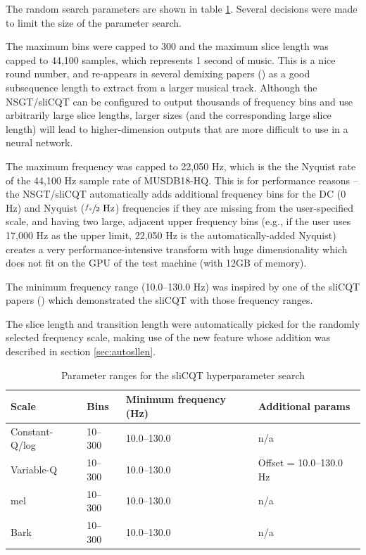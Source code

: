 \documentclass[report.tex]{subfiles}
\begin{document}
The random search parameters are shown in table \ref{table:slicqparams}. Several decisions were made to limit the size of the parameter search.

The maximum bins were capped to 300 and the maximum slice length was capped to 44,100 samples, which represents 1 second of music. This is a nice round number, and re-appears in several demixing papers (\cite{plumbley1, plumbley2, demucs}) as a good subsequence length to extract from a larger musical track. Although the NSGT/sliCQT can be configured to output thousands of frequency bins and use arbitrarily large slice lengths, larger sizes (and the corresponding large slice length) will lead to higher-dimension outputs that are more difficult to use in a neural network.

The maximum frequency was capped to 22,050 Hz, which is the the Nyquist rate of the 44,100 Hz sample rate of MUSDB18-HQ. This is for performance reasons -- the NSGT/sliCQT automatically adds additional frequency bins for the DC (0 Hz) and Nyquist ($\sfrac{f_{s}}{2} \text{ Hz}$) frequencies if they are missing from the user-specified scale, and having two large, adjacent upper frequency bins (e.g., if the user uses 17,000 Hz as the upper limit, 22,050 Hz is the automatically-added Nyquist) creates a very performance-intensive transform with huge dimensionality which does not fit on the GPU of the test machine (with 12GB of memory).

The minimum frequency range (10.0--130.0 Hz) was inspired by one of the sliCQT papers (\cite{slicq}) which demonstrated the sliCQT with those frequency ranges.

The slice length and transition length were automatically picked for the randomly selected frequency scale, making use of the new feature whose addition was described in section \ref{sec:autosllen}.

\begin{table}[ht]
	\centering
\begin{tabular}{ |l|l|l|l| }
	 \hline
	 Scale & Bins & Minimum frequency (Hz) & Additional params \\
	 \hline
	 \hline
	 Constant-Q/log & 10--300 & 10.0--130.0 & n/a \\
	 \hline
	 Variable-Q & 10--300 & 10.0--130.0 & Offset = 10.0--130.0 Hz \\
	 \hline
	 \hline
	 mel & 10--300 & 10.0--130.0 & n/a \\
	 \hline
	 Bark & 10--300 & 10.0--130.0 & n/a \\
	 \hline
\end{tabular}
	\caption{Parameter ranges for the sliCQT hyperparameter search}
	\label{table:slicqparams}
\end{table}
\end{document}
